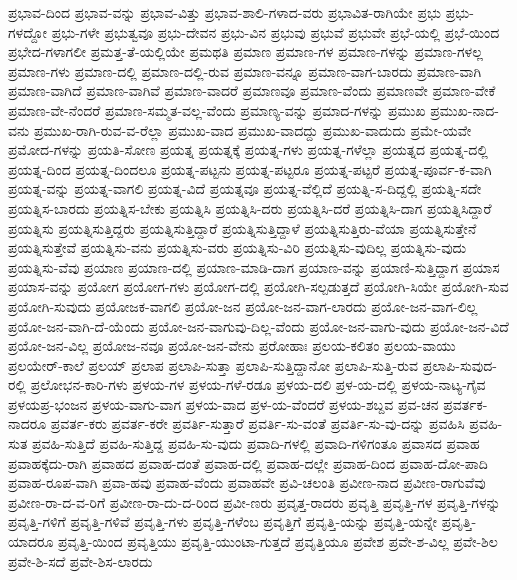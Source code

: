 {ಪ್ರಭಾವ-ದಿಂದ
ಪ್ರಭಾವ-ವನ್ನು
ಪ್ರಭಾವ-ವಿತ್ತು
ಪ್ರಭಾವ-ಶಾಲಿ-ಗಳಾದ-ವರು
ಪ್ರಭಾವಿತ-ರಾಗಿಯೇ
ಪ್ರಭು
ಪ್ರಭು-ಗಳದ್ದೋ
ಪ್ರಭು-ಗಳೇ
ಪ್ರಭುತ್ವವೂ
ಪ್ರಭು-ದೇವನ
ಪ್ರಭು-ವಿನ
ಪ್ರಭುವು
ಪ್ರಭುವೆ
ಪ್ರಭುವೇ
ಪ್ರಭೆ-ಯಲ್ಲಿ
ಪ್ರಭೆ-ಯಿಂದ
ಪ್ರಭೇದ-ಗಳಾಗಲೀ
ಪ್ರಮತ್ತ-ತೆ-ಯಲ್ಲಿಯೇ
ಪ್ರಮಥತಿ
ಪ್ರಮಾಣ
ಪ್ರಮಾಣ-ಗಳ
ಪ್ರಮಾಣ-ಗಳನ್ನು
ಪ್ರಮಾಣ-ಗಳಲ್ಲ
ಪ್ರಮಾಣ-ಗಳು
ಪ್ರಮಾಣ-ದಲ್ಲಿ
ಪ್ರಮಾಣ-ದಲ್ಲಿ-ರುವ
ಪ್ರಮಾಣ-ವನ್ನೂ
ಪ್ರಮಾಣ-ವಾಗ-ಬಾರದು
ಪ್ರಮಾಣ-ವಾಗಿ
ಪ್ರಮಾಣ-ವಾಗಿದೆ
ಪ್ರಮಾಣ-ವಾಗಿವೆ
ಪ್ರಮಾಣ-ವಾದರೆ
ಪ್ರಮಾಣವೂ
ಪ್ರಮಾಣ-ವೆಂದು
ಪ್ರಮಾಣವೇ
ಪ್ರಮಾಣ-ವೇಕೆ
ಪ್ರಮಾಣ-ವೇ-ನೆಂದರೆ
ಪ್ರಮಾಣ-ಸಮ್ಮತ-ವಲ್ಲ-ವೆಂದು
ಪ್ರಮಾಣ್ಯ-ವನ್ನು
ಪ್ರಮಾದ-ಗಳನ್ನು
ಪ್ರಮುಖ
ಪ್ರಮುಖ-ನಾದ-ವನು
ಪ್ರಮುಖ-ರಾಗಿ-ರುವ-ವ-ರೆಲ್ಲಾ
ಪ್ರಮುಖ-ವಾದ
ಪ್ರಮುಖ-ವಾದದ್ದು
ಪ್ರಮುಖ-ವಾದುದು
ಪ್ರಮೇ-ಯವೇ
ಪ್ರಮೋದ-ಗಳನ್ನು
ಪ್ರಯತಿ-ಸೋಣ
ಪ್ರಯತ್ನ
ಪ್ರಯತ್ನಕ್ಕೆ
ಪ್ರಯತ್ನ-ಗಳು
ಪ್ರಯತ್ನ-ಗಳೆಲ್ಲಾ
ಪ್ರಯತ್ನದ
ಪ್ರಯತ್ನ-ದಲ್ಲಿ
ಪ್ರಯತ್ನ-ದಿಂದ
ಪ್ರಯತ್ನ-ದಿಂದಲೂ
ಪ್ರಯತ್ನ-ಪಟ್ಟನು
ಪ್ರಯತ್ನ-ಪಟ್ಟರೂ
ಪ್ರಯತ್ನ-ಪಟ್ಟರೆ
ಪ್ರಯತ್ನ-ಪೂರ್ವ-ಕ-ವಾಗಿ
ಪ್ರಯತ್ನ-ವನ್ನು
ಪ್ರಯತ್ನ-ವಾಗಲಿ
ಪ್ರಯತ್ನ-ವಿದೆ
ಪ್ರಯತ್ನವೂ
ಪ್ರಯತ್ನ-ವೆಲ್ಲಿದೆ
ಪ್ರಯತ್ನಿ-ಸ-ದಿದ್ದಲ್ಲಿ
ಪ್ರಯತ್ನಿ-ಸದೇ
ಪ್ರಯತ್ನಿಸ-ಬಾರದು
ಪ್ರಯತ್ನಿಸ-ಬೇಕು
ಪ್ರಯತ್ನಿಸಿ
ಪ್ರಯತ್ನಿಸಿ-ದರು
ಪ್ರಯತ್ನಿಸಿ-ದರೆ
ಪ್ರಯತ್ನಿಸಿ-ದಾಗ
ಪ್ರಯತ್ನಿಸಿದ್ದಾರೆ
ಪ್ರಯತ್ನಿಸು
ಪ್ರಯತ್ನಿಸುತ್ತಿದ್ದರು
ಪ್ರಯತ್ನಿಸುತ್ತಿದ್ದಾರೆ
ಪ್ರಯತ್ನಿಸುತ್ತಿದ್ದಾಳೆ
ಪ್ರಯತ್ನಿಸುತ್ತಿರು-ವೆಯಾ
ಪ್ರಯತ್ನಿಸುತ್ತೇನೆ
ಪ್ರಯತ್ನಿಸುತ್ತೇವೆ
ಪ್ರಯತ್ನಿಸು-ವನು
ಪ್ರಯತ್ನಿಸು-ವರು
ಪ್ರಯತ್ನಿಸು-ವಿರಿ
ಪ್ರಯತ್ನಿಸು-ವುದಿಲ್ಲ
ಪ್ರಯತ್ನಿಸು-ವುದು
ಪ್ರಯತ್ನಿಸು-ವೆವು
ಪ್ರಯಾಣ
ಪ್ರಯಾಣ-ದಲ್ಲಿ
ಪ್ರಯಾಣ-ಮಾಡಿ-ದಾಗ
ಪ್ರಯಾಣ-ವನ್ನು
ಪ್ರಯಾಣಿ-ಸುತ್ತಿದ್ದಾಗ
ಪ್ರಯಾಸ
ಪ್ರಯಾಸ-ವನ್ನು
ಪ್ರಯೋಗ
ಪ್ರಯೋಗ-ಗಳು
ಪ್ರಯೋಗ-ದಲ್ಲಿ
ಪ್ರಯೋಗಿ-ಸಲ್ಪಡುತ್ತದೆ
ಪ್ರಯೋಗಿ-ಸಿಯೇ
ಪ್ರಯೋಗಿ-ಸುವ
ಪ್ರಯೋಗಿ-ಸುವುದು
ಪ್ರಯೋಜಕ-ವಾಗಲಿ
ಪ್ರಯೋ-ಜನ
ಪ್ರಯೋ-ಜನ-ವಾಗ-ಲಾರದು
ಪ್ರಯೋ-ಜನ-ವಾಗ-ಲಿಲ್ಲ
ಪ್ರಯೋ-ಜನ-ವಾಗಿ-ದೆ-ಯೆಂದು
ಪ್ರಯೋ-ಜನ-ವಾಗುವು-ದಿಲ್ಲ-ವೆಂದು
ಪ್ರಯೋ-ಜನ-ವಾಗು-ವುದು
ಪ್ರಯೋ-ಜನ-ವಿದೆ
ಪ್ರಯೋ-ಜನ-ವಿಲ್ಲ
ಪ್ರಯೋಜ-ನವೂ
ಪ್ರಯೋ-ಜನ-ವೇನು
ಪ್ರರೋಹಾಃ
ಪ್ರಲಯ-ಕಲಿತಂ
ಪ್ರಲಯ-ವಾಯು
ಪ್ರಲಯೇರ್-ಕಾಲೆ
ಪ್ರಲಯ್
ಪ್ರಲಾಪ
ಪ್ರಲಾಪಿ-ಸುತ್ತಾ
ಪ್ರಲಾಪಿ-ಸುತ್ತಿದ್ದಾನೋ
ಪ್ರಲಾಪಿ-ಸುತ್ತಿ-ರುವ
ಪ್ರಲಾಪಿ-ಸುವುದ-ರಲ್ಲಿ
ಪ್ರಲೋಭನ-ಕಾರಿ-ಗಳು
ಪ್ರಳಯ-ಗಳ
ಪ್ರಳಯ-ಗಳೆ-ರಡೂ
ಪ್ರಳಯ-ದಲಿ
ಪ್ರಳ-ಯ-ದಲ್ಲಿ
ಪ್ರಳಯ-ನಾಟ್ಯ-ಗೈವ
ಪ್ರಳಯಪ್ರ-ಭಂಜನ
ಪ್ರಳಯ-ವಾಗು-ವಾಗ
ಪ್ರಳಯ-ವಾದ
ಪ್ರಳ-ಯ-ವೆಂದರೆ
ಪ್ರಳಯ-ಶಬ್ದವ
ಪ್ರವ-ಚನ
ಪ್ರವರ್ತಕ-ನಾದರೂ
ಪ್ರವರ್ತ-ಕರು
ಪ್ರವರ್ತ-ಕರೇ
ಪ್ರವರ್ತಿ-ಸುತ್ತಾರೆ
ಪ್ರವರ್ತಿ-ಸು-ವಂತೆ
ಪ್ರವರ್ತಿ-ಸು-ವು-ದನ್ನು
ಪ್ರವಹಿಸಿ
ಪ್ರವಹಿ-ಸುತ
ಪ್ರವಹಿ-ಸುತ್ತಿದೆ
ಪ್ರವಹಿ-ಸುತ್ತಿದ್ದ
ಪ್ರವಹಿ-ಸು-ವುದು
ಪ್ರವಾದಿ-ಗಳಲ್ಲಿ
ಪ್ರವಾದಿ-ಗಳಿಗಂತೂ
ಪ್ರವಾಸದ
ಪ್ರವಾಹ
ಪ್ರವಾಹಕ್ಕೆದು-ರಾಗಿ
ಪ್ರವಾಹದ
ಪ್ರವಾಹ-ದಂತೆ
ಪ್ರವಾಹ-ದಲ್ಲಿ
ಪ್ರವಾಹ-ದಲ್ಲೇ
ಪ್ರವಾಹ-ದಿಂದ
ಪ್ರವಾಹ-ದೋ-ಪಾದಿ
ಪ್ರವಾಹ-ರೂಪ-ವಾಗಿ
ಪ್ರವಾ-ಹವು
ಪ್ರವಾಹ-ವೆಂದು
ಪ್ರವಾಹವೇ
ಪ್ರವಿ-ಚಲಂತಿ
ಪ್ರವೀಣ-ನಾದ
ಪ್ರವೀಣ-ರಾಗುವೆವು
ಪ್ರವೀಣ-ರಾ-ದ-ವ-ರಿಗೆ
ಪ್ರವೀಣ-ರಾ-ದು-ದ-ರಿಂದ
ಪ್ರವೀ-ಣರು
ಪ್ರವೃತ್ತ-ರಾದರು
ಪ್ರವೃತ್ತಿ
ಪ್ರವೃತ್ತಿ-ಗಳ
ಪ್ರವೃತ್ತಿ-ಗಳನ್ನು
ಪ್ರವೃತ್ತಿ-ಗಳಿಗೆ
ಪ್ರವೃತ್ತಿ-ಗಳಿವೆ
ಪ್ರವೃತ್ತಿ-ಗಳು
ಪ್ರವೃತ್ತಿ-ಗಳೆಂಬ
ಪ್ರವೃತ್ತಿಗೆ
ಪ್ರವೃತ್ತಿ-ಯನ್ನು
ಪ್ರವೃತ್ತಿ-ಯನ್ನೇ
ಪ್ರವೃತ್ತಿ-ಯಾದರೂ
ಪ್ರವೃತ್ತಿ-ಯಿಂದ
ಪ್ರವೃತ್ತಿಯು
ಪ್ರವೃತ್ತಿ-ಯುಂಟಾ-ಗುತ್ತದೆ
ಪ್ರವೃತ್ತಿಯೂ
ಪ್ರವೇಶ
ಪ್ರವೇ-ಶ-ವಿಲ್ಲ
ಪ್ರವೇ-ಶಿಲ
ಪ್ರವೇ-ಶಿ-ಸದೆ
ಪ್ರವೇ-ಶಿಸ-ಲಾರದು
}
